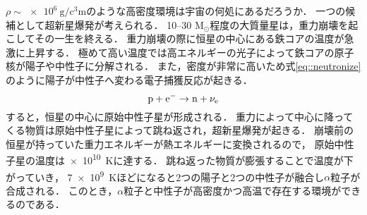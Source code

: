 \documentclass[../master]{subfiles}
\begin{document}
$\rho\sim\SI{e6}{\gram\per\cubic\centi\metre}$のような高密度環境は宇宙の何処にあるだろうか．
一つの候補として超新星爆発が考えられる．
10--30 $\mathrm{M_{\odot}}$程度の大質量星は，重力崩壊を起こしてその一生を終える．
重力崩壊の際に恒星の中心にある鉄コアの温度が急激に上昇する．
極めて高い温度では高エネルギーの光子によって鉄コアの原子核が陽子や中性子に分解される．
また，密度が非常に高いため式\eqref{eq::neutronize}のように陽子が中性子へ変わる電子捕獲反応が起きる．
\begin{equation}
  {\rm p}+{\rm e}^{-} \rightarrow {\rm n}+\nu_{\rm e}
  \label{eq::neutronize}
\end{equation}
すると，恒星の中心に原始中性子星が形成される．
重力によって中心に降ってくる物質は原始中性子星によって跳ね返され，超新星爆発が起きる．
崩壊前の恒星が持っていた重力エネルギーが熱エネルギーに変換されるので，
原始中性子星の温度は\SI{e10}{\kelvin}に達する．
跳ね返った物質が膨張することで温度が下がっていき，
\SI{7e9}{\kelvin}ほどになると2つの陽子と2つの中性子が融合し$\alpha$粒子が合成される．
このとき，$\alpha$粒子と中性子が高密度かつ高温で存在する環境ができるのである．
\end{document}
